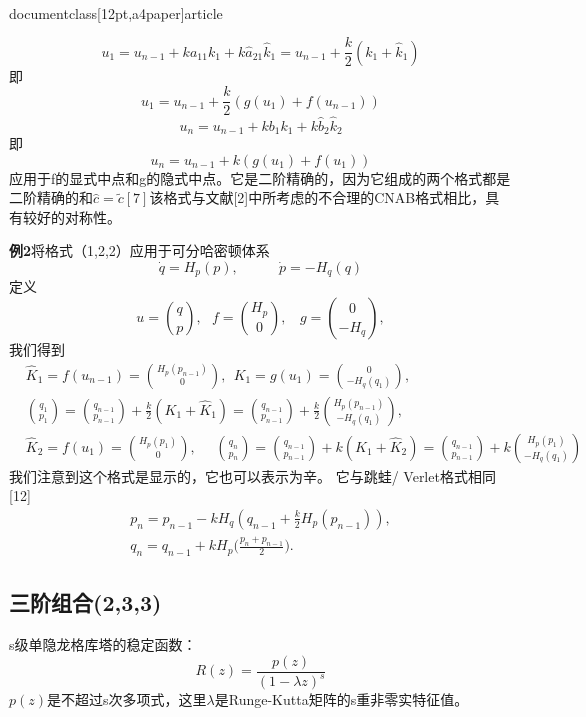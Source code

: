 \\documentclass[12pt,a4paper]{article}
\begin{document}
\begin{equation*}
u_{1}=u_{n-1}+ka_{11}k_{1}+k\hat{a}_{21}\hat{k}_{1}=u_{n-1}+\frac{k}{2}(k_{1}+\hat{k}_{1})
\end{equation*}
即
\begin{equation*}
u_{1}=u_{n-1}+\frac{k}{2}(g(u_{1})+f(u_{n-1}))
\end{equation*}
\begin{equation*}
u_{n}=u_{n-1}+kb_{1}k_{1}+k\hat{b}_{2}\hat{k}_{2}
\end{equation*}
即
\begin{equation*}
u_{n}=u_{n-1}+k(g(u_{1})+f(u_{1}))
\end{equation*}
应用于f的显式中点和g的隐式中点。它是二阶精确的，因为它组成的两个格式都是二阶精确的和$\widehat{c}=\tilde{c}[7]$该格式与文献[2]中所考虑的不合理的CNAB格式相比，具有较好的对称性。

\textbf{例2}将格式（1,2,2）应用于可分哈密顿体系
\begin{equation}
\dot{q}=H_{p}(p),~~~~~~~~~~~~~\dot{p}=-H_{q}(q)
\end{equation}
定义
\begin{equation}
u=\binom{q}{p},~~~f=\binom{H_{p}}{0},~~~~g=\binom{0}{-H_{q}},
\end{equation}
我们得到
\begin{align}
&\widehat{K}_{1}=f(u_{n-1})=\binom{H_{p}(p_{n-1})}{0},~~K_{1}=g(u_{1})=\binom{0}{-H_{q}(q_{1})},\\
&\binom{q_{1}}{p_{1}}=\binom{q_{n-1}}{p_{n-1}}+\frac{k}{2}(K_{1}+\widehat{K}_{1})=\binom{q_{n-1}}{p_{n-1}}+\frac{k}{2}\binom{H_{p}(p_{n-1})}{-H_{q}(q_{1})},\\
&\widehat{K}_{2}=f(u_{1})=\binom{H_{p}(p_{1})}{0},~~~~~~\binom{q_{n}}{p_{n}}=\binom{q_{n-1}}{p_{n-1}}+k(K_{1}+\widehat{K}_{2})=\binom{q_{n-1}}{p_{n-1}}+k\binom{H_{p}(p_{1})}{-H_{q}(q_{1})}
\end{align}
我们注意到这个格式是显示的，它也可以表示为辛。 它与跳蛙/ Verlet格式相同[12] 
\begin{gather}
p_{n}=p_{n-1}-kH_{q}(q_{n-1}+\frac{k}{2}H_{p}(p_{n-1})),\\
q_{n}=q_{n-1}+kH_{p}\bigg(\frac{p_{n}+p_{n-1}}{2}\biggl).
\end{gather}
\subsection{三阶组合(2,3,3)}
s级单隐龙格库塔的稳定函数：
\begin{equation*}
R(z)=\frac{p(z)}{(1-\lambda z)^s}
\end{equation*}
$p(z)$是不超过s次多项式，这里$\lambda$是Runge-Kutta矩阵的s重非零实特征值。
\end{document}
